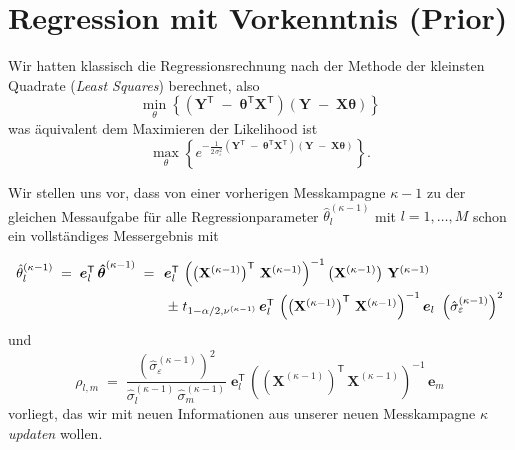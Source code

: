 \section{Regression mit Vorkenntnis (Prior)}
Wir hatten klassisch die Regressionsrechnung nach der Methode der kleinsten Quadrate
(\textsl{Least Squares}) berechnet, also
$$
\min\limits_{\theta} \left\{ \left(
\mathbf{Y}^\mathsf{T}
\; - \; 
\boldsymbol{\theta}^\mathsf{T} \mathbf{X}^\mathsf{T} \right)
\left( \mathbf{Y} \; - \;  \mathbf{X} \boldsymbol{\theta} \right)\right\}
$$
was äquivalent dem Maximieren der Likelihood ist
\begin{equation}
\max\limits_{\theta} \left\{ e^{-\frac{1}{2 \, \sigma_{\varepsilon}^2} \left(
	\mathbf{Y}^\mathsf{T}
	\; - \; 
	\boldsymbol{\theta}^\mathsf{T} \mathbf{X}^\mathsf{T} \right)
	\left(\mathbf{Y} \; - \;  \mathbf{X} \boldsymbol{\theta} \right)} \right\} .
\end{equation}

Wir stellen uns vor, dass von einer vorherigen Messkampagne $\kappa-1$ zu der gleichen Messaufgabe
für alle Regressionparameter $\hat \theta_l^{(\kappa-1)}$ mit $l = 1,\dots,M$ schon ein vollständiges Messergebnis mit
\begin{equation}
\arraycolsep=2.0pt\def\arraystretch{2.0}
\begin{array}{ll}
\hat \theta_l^{(\kappa-1)} \; = \; \boldsymbol{e}_l^\mathsf{T} \, \boldsymbol{\hat \theta}^{(\kappa-1)} \; = \; &
\boldsymbol{e}_l^\mathsf{T} \, \left( \left(\mathbf{X}^{(\kappa-1)}\right)^\mathsf{T}  \, \mathbf{X}^{(\kappa-1)} \right)^{-1} \left(\mathbf{X}^{(\kappa-1)}\right) \, \mathbf{Y}^{(\kappa-1)} \\
& \; \pm \; t_{1-\alpha/2, \nu^{(\kappa-1)}} \,
\boldsymbol{e}_l^\mathsf{T} \,  \left( \left(\mathbf{X}^{(\kappa-1)}\right)^\mathsf{T} \, \mathbf{X}^{(\kappa-1)} \right)^{-1}  \boldsymbol{e}_l \, 
\, \left(\hat \sigma_{\varepsilon}^{(\kappa-1)}\right)^2
\end{array}
\end{equation}
und
\begin{equation}
\rho_{l,m} \; = \;
\frac{\left(\hat \sigma_{\varepsilon}^{(\kappa-1)}\right)^2}{\hat \sigma_l^{(\kappa-1)} \,
	\hat \sigma_m^{(\kappa-1)}} \; \boldsymbol{e}_l^\mathsf{T} \,
\left( \left(\mathbf{X}^{(\kappa-1)}\right)^\mathsf{T} \, \mathbf{X}^{(\kappa-1)} \right)^{-1} \, \boldsymbol{e}_m 
\end{equation}
vorliegt, das wir mit neuen Informationen aus
unserer neuen Messkampagne $\kappa$ \textsl{updaten} wollen.

